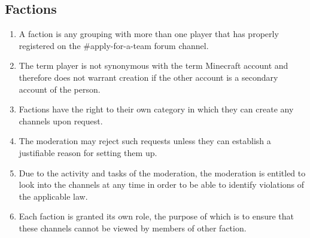 \documentclass{article}
\begin{document}
\subsection{Factions}
\begin{enumerate}[(1)]
    \item A faction is any grouping with more than one player that has properly registered on the \#apply-for-a-team forum channel.
	\item The term player is not synonymous with the term Minecraft account and therefore does not warrant creation if the other account is a secondary account of the person.
	\item Factions have the right to their own category in which they can create any channels upon request.
	\item The moderation may reject such requests unless they can establish a justifiable reason for setting them up.
	\item Due to the activity and tasks of the moderation, the moderation is entitled to look into the channels at any time in order to be able to identify violations of the applicable law.
	\item Each faction is granted its own role, the purpose of which is to ensure that these channels cannot be viewed by members of other faction.
\end{enumerate}
\end{document}
